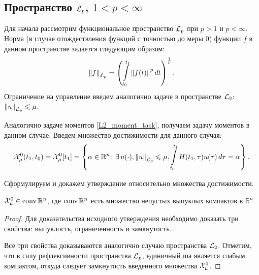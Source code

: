 \subsection{Пространство ${\mathcal{L}_p}$, $1 < p < \infty$}

Для начала рассмотрим функциональное пространство ${\mathcal{L}_p}$ при $p > 1$ и $p < \infty$.
Норма (в случае отождествления функций с точностью до меры $0$) функции $f$ в данном
пространстве задается следующим образом:
\begin{equation}
\label{Lp_norm}
  \left\| f \right\|_{{\mathcal{L}_p}} =
    \left(\int\limits_{t_0}^{t_1} \left\| f(t) \right\|^p dt\right)^{\frac{1}{p}}.
\end{equation}
Ограничение на управление введем аналогично задаче в пространстве ${\mathcal{L}_2}$:
$\left\| u \right\|_{\mathcal{L}_p} \leqslant \mu$.

Аналогично задаче моментов \eqref{L2_moment_task}, получаем задачу моментов в данном случае.
Введем множество достижимости для данного случая:
\begin{equation}
\label{Lp_moment_task_soa}
	\soa_\mu^0 (t_1, t_0) = \soa_\mu^0 [t_1] =
	\left\lbrace
	  \alpha \in \mathbb{R}^n \colon \exists u(\cdot), \norm{u}_{\Lp} \leqslant \mu,	  
	  \int\limits_{t_0}^{t_1} H(t_1, \tau) u(\tau)\,d\tau = \alpha
	\right\rbrace.
\end{equation}

Сформулируем и докажем утверждение относительно множества достижимости.

\begin{stm}
	$\mathcal{X}_\mu^0 \in \operatorname{conv} \mathbb{R}^n$, где $\operatorname{conv} \mathbb{R}^n$ есть множество
	непустых выпуклых компактов в $\mathbb{R}^n$.
\end{stm}

\begin{proof}
  Для доказательства исходного утверждения необходимо доказать
  три свойства: выпуклость, ограниченность и замкнутость.
	
	Все три свойства доказываются аналогично случаю пространства ${\mathcal{L}_2}$.
	Отметим, что в силу рефлексивности пространства ${\mathcal{L}_p}$, единичный ша является слабым
	компактом, откуда следует замкнутость введенного множества $\mathcal{X}_\mu^0$.
\end{proof}

